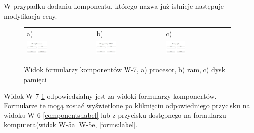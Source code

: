 W przypadku dodaniu komponentu, którego nazwa już istnieje następuje modyfikacja ceny.

\begin{figure}[htb]
  \centering
	\begin{tabular}{@{}lll@{}}
	a) & b) & c) \\
  \includegraphics[width=0.31\textwidth]{rys05/view/addProc.pdf} & 
	\includegraphics[width=0.31\textwidth]{rys05/view/addRam.pdf} &
	\includegraphics[width=0.31\textwidth]{rys05/view/addStorage.pdf}
	\end{tabular}
  \caption{Widok formularzy komponentów W-7, a) procesor, b) ram, c) dysk pamięci}
  \label{compforms:label}
\end{figure}

Widok W-7 \ref{compforms:label} odpowiedzialny jest za widoki formularzy komponentów. Formularze te mogą zostać wyświetlone po kliknięciu odpowiedniego przycisku na widoku W-6 \ref{components:label} lub z przycisku dostępnego na formularzu komputera(widok W-5a, W-5e, \ref{forms:label}.




